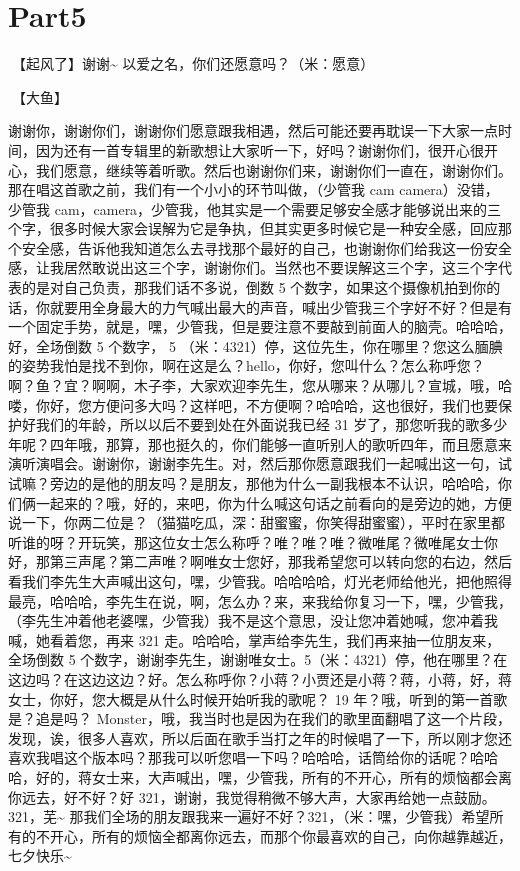 \documentclass[
]{book}
\begin{document}
\section{Part5}\label{nanjing-20240810-part5}

🎵【起风了】谢谢\textasciitilde{} 以爱之名，你们还愿意吗？（米：愿意）

🎵【大鱼】

谢谢你，谢谢你们，谢谢你们愿意跟我相遇，然后可能还要再耽误一下大家一点时间，因为还有一首专辑里的新歌想让大家听一下，好吗？谢谢你们，很开心很开心，我们愿意，继续等着听歌。然后也谢谢你们来，谢谢你们一直在，谢谢你们。那在唱这首歌之前，我们有一个小小的环节叫做，（少管我 cam camera）没错，少管我 cam，camera，少管我，他其实是一个需要足够安全感才能够说出来的三个字，很多时候大家会误解为它是争执，但其实更多时候它是一种安全感，回应那个安全感，告诉他我知道怎么去寻找那个最好的自己，也谢谢你们给我这一份安全感，让我居然敢说出这三个字，谢谢你们。当然也不要误解这三个字，这三个字代表的是对自己负责，那我们话不多说，倒数 5 个数字，如果这个摄像机拍到你的话，你就要用全身最大的力气喊出最大的声音，喊出少管我三个字好不好？但是有一个固定手势，就是，嘿，少管我，但是要注意不要敲到前面人的脑壳。哈哈哈，好，全场倒数 5 个数字， 5 （米：4321）停，这位先生，你在哪里？您这么腼腆的姿势我怕是找不到你，啊在这是么？hello，你好，您叫什么？怎么称呼您？啊？鱼？宜？啊啊，木子李，大家欢迎李先生，您从哪来？从哪儿？宣城，哦，哈喽，你好，您方便问多大吗？这样吧，不方便啊？哈哈哈，这也很好，我们也要保护好我们的年龄，所以以后不要到处在外面说我已经 31 岁了，那您听我的歌多少年呢？四年哦，那算，那也挺久的，你们能够一直听别人的歌听四年，而且愿意来演听演唱会。谢谢你，谢谢李先生。对，然后那你愿意跟我们一起喊出这一句，试试嘛？旁边的是他的朋友吗？是朋友，那他为什么一副我根本不认识，哈哈哈，你们俩一起来的？哦，好的，来吧，你为什么喊这句话之前看向的是旁边的她，方便说一下，你两二位是？（猫猫吃瓜，深：甜蜜蜜，你笑得甜蜜蜜），平时在家里都听谁的呀？开玩笑，那这位女士怎么称呼？唯？唯？唯？微唯尾？微唯尾女士你好，那第三声尾？第二声唯？啊唯女士您好，那我希望您可以转向您的右边，然后看我们李先生大声喊出这句，嘿，少管我。哈哈哈哈，灯光老师给他光，把他照得最亮，哈哈哈，李先生在说，啊，怎么办？来，来我给你复习一下，嘿，少管我，（李先生冲着他老婆嘿，少管我）我不是这个意思，没让您冲着她喊，您冲着我喊，她看着您，再来 321 走。哈哈哈，掌声给李先生，我们再来抽一位朋友来，全场倒数 5 个数字，谢谢李先生，谢谢唯女士。5（米：4321）停，他在哪里？在这边吗？在这边这边？好。怎么称呼你？小蒋？小贾还是小蒋？蒋，小蒋，好，蒋女士，你好，您大概是从什么时候开始听我的歌呢？ 19 年？哦，听到的第一首歌是？追是吗？ Monster，哦，我当时也是因为在我们的歌里面翻唱了这一个片段，发现，诶，很多人喜欢，所以后面在歌手当打之年的时候唱了一下，所以刚才您还喜欢我唱这个版本吗？那我可以听您唱一下吗？哈哈哈，话筒给你的话呢？哈哈哈，好的，蒋女士来，大声喊出，嘿，少管我，所有的不开心，所有的烦恼都会离你远去，好不好？好 321，谢谢，我觉得稍微不够大声，大家再给她一点鼓励。321，芜\textasciitilde{} 那我们全场的朋友跟我来一遍好不好？321，（米：嘿，少管我）希望所有的不开心，所有的烦恼全都离你远去，而那个你最喜欢的自己，向你越靠越近，七夕快乐\textasciitilde{}
\end{document}
